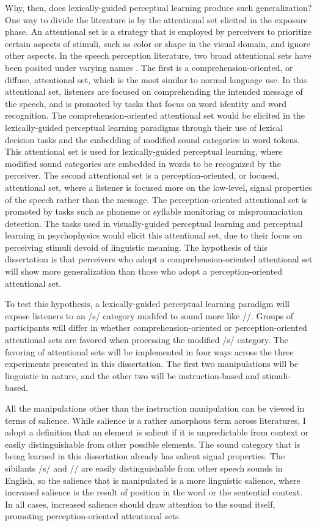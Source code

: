 Why, then, does lexically-guided perceptual learning produce such generalization?
One way to divide the literature is by the attentional set elicited in the exposure phase.
An attentional set is a strategy that is employed by perceivers to prioritize certain aspects of stimuli, such as color or shape in the visual domain, and ignore other aspects.
In the speech perception literature, two broad attentional sets have been posited under varying names \citep{Cutler1987, Pitt2012}.  
The first is a comprehension-oriented, or diffuse, attentional set, which is the most similar to normal language use.  
In this attentional set, listeners are focused on comprehending the intended message of the speech, and is promoted by tasks that focus on word identity and word recognition.
The comprehension-oriented attentional set would be elicited in the lexically-guided perceptual learning paradigms through their use of lexical decision tasks and the embedding of modified sound categories in word tokens.
This attentional set is used for lexically-guided perceptual learning, where modified sound categories are embedded in words to be recognized by the perceiver.
The second attentional set is a perception-oriented, or focused, attentional set, where a listener is focused more on the low-level, signal properties of the speech rather than the message.
The perception-oriented attentional set is promoted by tasks such as phoneme or syllable monitoring or mispronunciation detection.
The tasks used in visually-guided perceptual learning and perceptual learning in psychophysics would elicit this attentional set, due to their focus on perceiving stimuli devoid of linguistic meaning.
The hypothesis of this dissertation is that perceivers who adopt a comprehension-oriented attentional set will show more generalization than those who adopt a perception-oriented attentional set.

To test this hypothesis, a lexically-guided perceptual learning paradigm will expose listeners to an /s/ category modifed to sound more like /\textesh/.  
Groups of participants will differ in whether comprehension-oriented or perception-oriented attentional sets are favored when processing the modified /s/ category.
The favoring of attentional sets will be implemented in four ways across the three experiments presented in this dissertation.  
The first two manipulations will be linguistic in nature, and the other two will be instruction-based and stimuli-based.

All the manipulations other than the instruction manipulation can be viewed in terms of salience.
While salience is a rather amorphous term across literatures, I adopt a definition that an element is salient if it is unpredictable from context or easily distinguishable from other possible elements.  
The sound category that is being learned in this dissertation already has salient signal properties.  
The sibilants /s/ and /\textesh/ are easily distinguishable from other speech sounds in English, so the salience that is manipulated is a more linguistic salience, where increased salience is the result of position in the word or the sentential context.
In all cases, increased salience should draw attention to the sound itself, promoting perception-oriented attentional sets.

